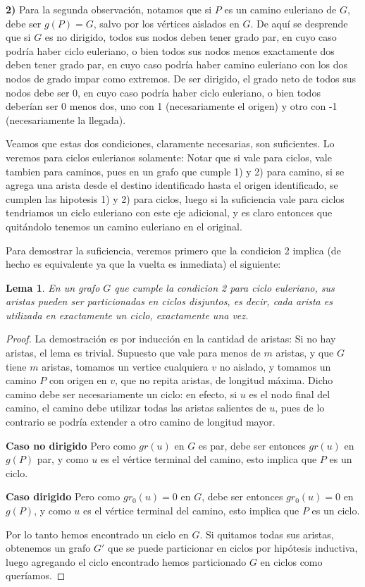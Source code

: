 \documentclass{article}
\newtheorem{lema}{{\sc Lema}}
\begin{document}
\textbf{2)} Para la segunda observación, notamos que si $P$ es un camino euleriano de $G$, debe ser $g(P) = G$, salvo por los vértices aislados en $G$. De aquí se desprende que si $G$ es no dirigido, todos sus nodos deben tener grado par, en cuyo caso podría haber ciclo euleriano, o bien todos sus nodos menos exactamente dos deben tener grado par, en cuyo caso podría haber camino euleriano con los dos nodos de grado impar como extremos. De ser dirigido, el grado neto de todos sus nodos debe ser 0, en cuyo caso podría haber ciclo euleriano, o bien todos deberían ser 0 menos dos, uno con 1 (necesariamente el origen) y otro con -1 (necesariamente la llegada).

Veamos que estas dos condiciones, claramente necesarias, son suficientes. Lo veremos para ciclos eulerianos solamente: Notar que si vale para ciclos, vale tambien para caminos, pues en un grafo que cumple 1) y 2) para camino, si se agrega una arista desde el destino identificado hasta el origen identificado, se cumplen las hipotesis 1) y 2) para ciclos, luego si la suficiencia vale para ciclos tendriamos un ciclo euleriano con este eje adicional, y es claro entonces que quitándolo tenemos un camino euleriano en el original.

Para demostrar la suficiencia, veremos primero que la condicion 2 implica (de hecho es equivalente ya que la vuelta es inmediata) el siguiente:

\begin{lema}
En un grafo $G$ que cumple la condicion 2 para ciclo euleriano, sus aristas pueden ser particionadas en ciclos disjuntos, es decir, cada arista es utilizada en exactamente un ciclo, exactamente una vez.
\end{lema}
\begin{proof}
La demostración es por inducción en la cantidad de aristas: Si no hay aristas, el lema es trivial. Supuesto que vale para menos de $m$ aristas, y que $G$ tiene $m$ aristas, tomamos un vertice cualquiera $v$ no aislado, y tomamos un camino $P$ con origen en $v$, que no repita aristas, de longitud máxima. Dicho camino debe ser necesariamente un ciclo: en efecto, si $u$ es el nodo final del camino, el camino debe utilizar todas las aristas salientes de $u$, pues de lo contrario se podría extender a otro camino de longitud mayor. 

\textbf{Caso no dirigido} Pero como $gr(u)$ en $G$ es par, debe ser entonces $gr(u)$ en $g(P)$ par, y como $u$ es el vértice terminal del camino, esto implica que $P$ es un ciclo.

\textbf{Caso dirigido} Pero como $gr_0(u) = 0$ en $G$, debe ser entonces $gr_0(u) = 0$ en $g(P)$, y como $u$ es el vértice terminal del camino, esto implica que $P$ es un ciclo.

Por lo tanto hemos encontrado un ciclo en $G$. Si quitamos todas sus aristas, obtenemos un grafo $G'$ que se puede particionar en ciclos por hipótesis inductiva, luego agregando el ciclo encontrado hemos particionado $G$ en ciclos como queríamos.
\end{proof}
\end{document}
